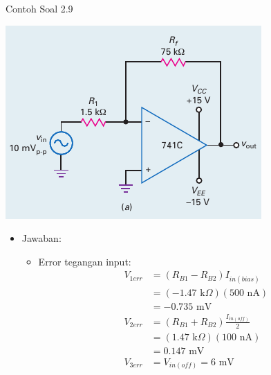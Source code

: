 \begin{frame}[t]{Contoh Soal 2.9}
	\begin{multicols}{2}
		\begin{center}
			\includegraphics[width=\linewidth]{gambar/fig-16.17a}
		\end{center}
		\columnbreak
		\begin{itemize}
			\item Jawaban:
			\begin{itemize}
				\item Error tegangan input:
				\begin{align*}
					V_{1err} &= (R_{B1} - R_{B2})I_{in(bias)} \\
					&= ( - 1.47 \text{ k}\Omega )(500 \text{ nA}) \\
					&= -0.735 \text{ mV} \\
					V_{2err} &= (R_{B1} + R_{B2}) \frac{I_{in(off)}}{2} \\
					&= ( 1.47 \text{ k}\Omega )(100 \text{ nA}) \\
					&= 0.147 \text{ mV} \\
					V_{3err} &= V_{in(off)} = 6 \text{ mV}
				\end{align*}
			\end{itemize}
		\end{itemize}
	\end{multicols}
\end{frame}

